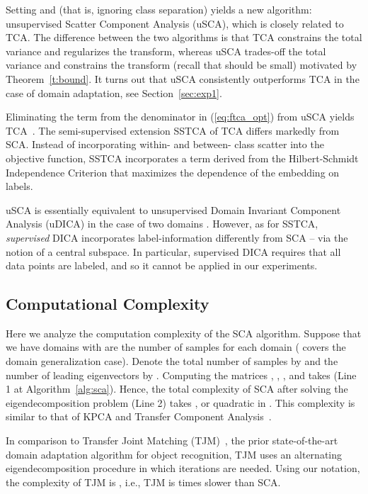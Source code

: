 \documentclass[10pt,journal,compsoc]{IEEEtran}
\begin{document}
Setting  and  (that is, ignoring class separation) yields a new algorithm: unsupervised Scatter Component Analysis (uSCA), which is closely related to TCA. 
The difference between the two algorithms is that TCA constrains the total variance and regularizes the transform, 
whereas uSCA trades-off the total variance and constrains the transform (recall that  should be small) motivated by Theorem~\ref{t:bound}. 
It turns out that uSCA consistently outperforms TCA in the case of domain adaptation, see Section~\ref{sec:exp1}.

Eliminating the term  from the denominator in (\ref{eq:ftca_opt}) from uSCA yields TCA~\cite{Pan2011}.
The semi-supervised extension SSTCA of TCA differs markedly from SCA. Instead of incorporating within- and between- class scatter into the objective function, SSTCA incorporates a term derived from the Hilbert-Schmidt Independence Criterion that maximizes the dependence of the embedding on labels. 

uSCA is essentially equivalent to unsupervised Domain Invariant Component Analysis (uDICA) in the case of two domains \cite{Muandet2013}. However, as for SSTCA, \emph{supervised} DICA incorporates label-information differently from SCA -- via the notion of a central subspace. In particular, supervised DICA requires that all data points are labeled, and so it cannot be applied in our experiments.

\vspace{-1em}
\subsection{Computational Complexity}
\label{s:runtime}
Here we analyze the computation complexity of the SCA algorithm.
Suppose that we have  domains with  are the number of samples for each domain ( covers the domain generalization case).
Denote the total number of samples by  and the number of leading eigenvectors by .
Computing the matrices , , , and  takes  (Line 1 at Algorithm~\ref{alg:sca}). 
Hence, the total complexity of SCA after solving the eigendecomposition problem (Line 2) takes , or quadratic in .
This complexity is similar to that of KPCA and Transfer Component Analysis~\cite{Pan2011}.

In comparison to Transfer Joint Matching (TJM)~\cite{Long2014a}, the prior state-of-the-art domain adaptation algorithm for object recognition, TJM uses an alternating eigendecomposition procedure in which  iterations are needed.
Using our notation, the complexity of TJM is , i.e., TJM is  times slower than SCA.
\end{document}
